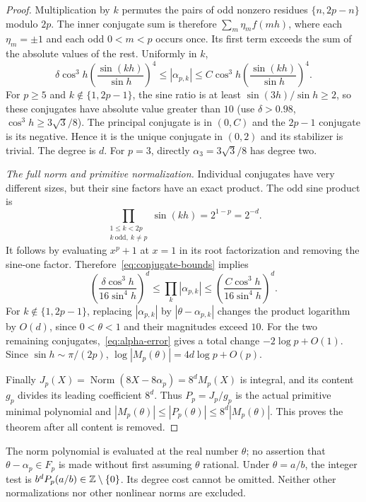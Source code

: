 \begin{proof}
Multiplication by $k$ permutes the pairs of odd nonzero residues
$\{n,2p-n\}$ modulo $2p$. The inner conjugate sum is therefore
$\sum_m\eta_m f(mh)$, where each $\eta_m=\pm1$ and each odd
$0<m<p$ occurs once. Its first term exceeds the sum of the absolute
values of the rest. Uniformly in $k$,
\begin{equation}\label{eq:conjugate-bounds}
 \delta\cos^3h\left(\frac{\sin(kh)}{\sin h}\right)^4
 \leq|\alpha_{p,k}|\leq
 C\cos^3h\left(\frac{\sin(kh)}{\sin h}\right)^4.
\end{equation}
For $p\geq5$ and $k\notin\{1,2p-1\}$, the sine ratio is at least
$\sin(3h)/\sin h\geq2$, so these conjugates have absolute value
greater than $10$ (use $\delta>0.98$, $\cos^3h\geq3\sqrt3/8$).
The principal conjugate is in $(0,C)$ and the $2p-1$ conjugate is
its negative. Hence it is the unique conjugate in $(0,2)$ and its
stabilizer is trivial. The degree is $d$. For $p=3$, directly
$\alpha_3=3\sqrt3/8$ has degree two.

\emph{The full norm and primitive normalization.} Individual
conjugates have very different sizes, but their sine factors have an
exact product. The odd sine product is
\[
 \prod_{\substack{1\leq k<2p\\k\ \text{odd},\ k\ne p}}\sin(kh)
       =2^{1-p}=2^{-d}.
\]
It follows by evaluating $x^p+1$ at $x=1$ in its root factorization
and removing the sine-one factor. Therefore~\eqref{eq:conjugate-bounds}
implies
\[
 \left(\frac{\delta\cos^3h}{16\sin^4h}\right)^d
 \leq\prod_k|\alpha_{p,k}|\leq
 \left(\frac{C\cos^3h}{16\sin^4h}\right)^d.
\]
For $k\notin\{1,2p-1\}$, replacing $|\alpha_{p,k}|$ by
$|\theta-\alpha_{p,k}|$ changes the product logarithm by $O(d)$,
since $0<\theta<1$ and their magnitudes exceed $10$.
For the two remaining conjugates,~\eqref{eq:alpha-error} gives a
total change $-2\log p+O(1)$. Since $\sin h\sim\pi/(2p)$,
$\log|M_p(\theta)|=4d\log p+O(p)$.

Finally $J_p(X)=\operatorname{Norm}(8X-8\alpha_p)=8^dM_p(X)$
is integral, and its content $g_p$ divides its leading coefficient
$8^d$. Thus $P_p=J_p/g_p$ is the actual primitive minimal polynomial
and $|M_p(\theta)|\leq|P_p(\theta)|\leq8^d|M_p(\theta)|$.
This proves the theorem after all content is removed.
\end{proof}

The norm polynomial is evaluated at the real number $\theta$; no
assertion that $\theta-\alpha_p\in F_p$ is made without first
assuming $\theta$ rational. Under $\theta=a/b$, the integer test is
$b^dP_p(a/b)\in\mathbb Z\setminus\{0\}$. Its degree cost cannot be omitted.
Neither other normalizations nor other nonlinear norms are excluded.
